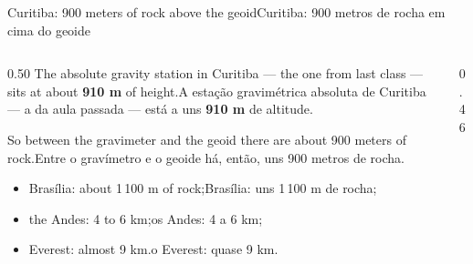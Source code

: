 \documentclass[aspectratio=169,11pt]{beamer}
\newcommand{\tr}[2]{\ifEN#2\else#1\fi}
\newcommand{\bnum}[1]{\textbf{\textcolor{mTeal}{#1}}}
\begin{document}
\begin{frame}{\tr{Curitiba: 900 metros de rocha em cima do geoide}{Curitiba: 900 meters of rock
  above the geoid}}
  \begin{columns}[T]
    \begin{column}{0.50\textwidth}
      \tr{A estação gravimétrica absoluta de Curitiba --- a da aula passada --- está a uns
      \bnum{910 m} de altitude.}{The absolute gravity station in Curitiba --- the one from last
      class --- sits at about \bnum{910 m} of height.}
      \medskip

      \tr{Entre o gravímetro e o geoide há, então, uns \alert{900 metros de rocha}.}{So between
      the gravimeter and the geoid there are about \alert{900 meters of rock}.}
      \medskip
      \begin{itemize}
        \item \tr{Brasília: uns 1\,100 m de rocha;}{Brasília: about 1\,100 m of rock;}
        \item \tr{os Andes: 4 a 6 km;}{the Andes: 4 to 6 km;}
        \item \tr{o Everest: quase 9 km.}{Everest: almost 9 km.}
      \end{itemize}
    \end{column}
    \begin{column}{0.46\textwidth}
      \centering
    \end{column}
  \end{columns}
\end{frame}
\end{document}

